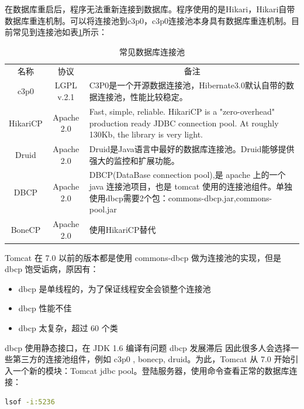 \documentclass[12pt]{book}
\numberwithin{dummy}{section}
\theoremstyle{ocrenumbox}
\theoremstyle{blacknumex}
\theoremstyle{blacknumbox}
\theoremstyle{ocrenum}
\begin{document}
在数据库重启后，程序无法重新连接到数据库。程序使用的是Hikari，Hikari自带数据库重连机制。可以将连接池到c3p0，c3p0连接池本身具有数据库重连机制。目前常见到连接池如表\ref{table:databaseconnectionpool}所示：

\begin{table}
	\caption{常见数据库连接池}
	\label{table:databaseconnectionpool}
	\begin{center}
	\begin{tabular}{|c|c|p{7cm}|}
		\hline
		\multirow{1}{*}{名称}
		& \multicolumn{1}{c|}{协议} 
		& \multicolumn{1}{c|}{备注}\\			
		\cline{1-3}
		c3p0 &  LGPL v.2.1  & C3P0是一个开源数据连接池，Hibernate3.0默认自带的数据连接池，性能比较稳定。\\
		\hline
		HikariCP & Apache 2.0 & Fast, simple, reliable. HikariCP is a "zero-overhead" production ready JDBC connection pool. At roughly 130Kb, the library is very light. \\
		\hline
		Druid & Apache 2.0 & Druid是Java语言中最好的数据库连接池。Druid能够提供强大的监控和扩展功能。 \\
		\hline
		DBCP & Apache 2.0 & DBCP(DataBase connection pool),是 apache 上的一个 java 连接池项目，也是 tomcat 使用的连接池组件。单独使用dbcp需要2个包：commons-dbcp.jar,commons-pool.jar \\
		\hline
		BoneCP & Apache 2.0 & 使用HikariCP替代\\
		\hline
	\end{tabular}	
	\end{center}
\end{table}


Tomcat 在 7.0 以前的版本都是使用 commons-dbcp 做为连接池的实现，但是 dbcp 饱受诟病，原因有：

\begin{itemize}
	\item{dbcp 是单线程的，为了保证线程安全会锁整个连接池}
	\item{dbcp 性能不佳}
	\item{dbcp 太复杂，超过 60 个类}
\end{itemize}

dbcp 使用静态接口，在 JDK 1.6 编译有问题
dbcp 发展滞后
因此很多人会选择一些第三方的连接池组件，例如 c3p0 , bonecp, druid。为此，Tomcat 从 7.0 开始引入一个新的模块：Tomcat jdbc pool。登陆服务器，使用命令查看正常的数据库连接：

\begin{lstlisting}[language=Bash]
lsof -i:5236
\end{lstlisting}
\end{document}
